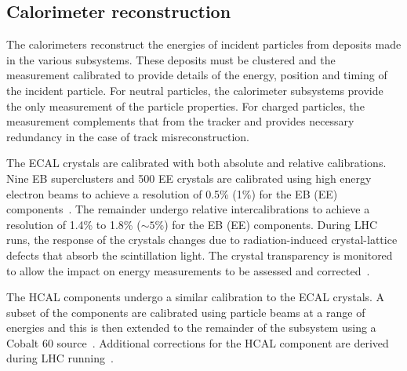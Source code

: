 \subsection{Calorimeter reconstruction}

The calorimeters reconstruct the energies of incident particles from deposits made in the 
various subsystems. These deposits must be clustered and the measurement calibrated to provide 
details of the energy, position and timing of the incident particle.
For neutral particles, the calorimeter subsystems provide the only measurement of
the particle properties. For charged particles, the measurement complements that
from the tracker and provides necessary redundancy in the case of track
misreconstruction.

The ECAL crystals are calibrated with both absolute and relative calibrations. Nine EB superclusters
and 500 EE crystals are calibrated using high energy electron beams to achieve a 
resolution of 0.5\% (1\%) for the EB (EE) components~\cite{ecal_performance2}. 
The remainder undergo relative intercalibrations to achieve a resolution of 1.4\% to 1.8\% ($\sim5\%$) 
for the EB (EE) components. During LHC runs, the response of the crystals changes due to 
radiation-induced crystal-lattice defects that absorb the scintillation light. 
The crystal transparency is monitored to allow the impact on energy measurements to
be assessed and corrected~\cite{ecal_performance2}. 

The HCAL components undergo a similar calibration to the ECAL crystals. A subset of the 
components are calibrated using particle beams at a range of energies and
this is then extended to the remainder of the 
subsystem using a Cobalt 60 source~\cite{hcal_performance}. Additional corrections
for the HCAL component are derived during LHC running~\cite{hcal_calib}.

%

